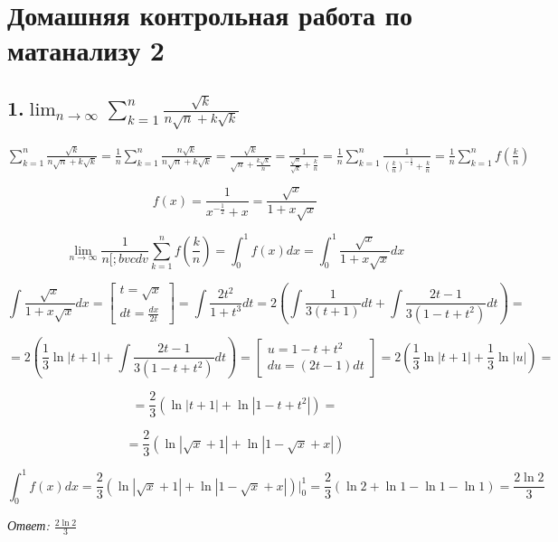 \documentclass[a4paper]{article}
\author{Васильев Павел}
\begin{document}
\section*{Домашняя контрольная работа по матанализу 2}

\subsection*{1.$\displaystyle \lim_{n \rightarrow \infty} \sum_{k=1}^n \frac{\sqrt{k}}{n \sqrt{n} + k \sqrt{k}}$}

$\displaystyle \sum_{k=1}^n \frac{\sqrt{k}}{n \sqrt{n} + k \sqrt{k}} = \frac{1}{n} \sum_{k=1}^n \frac{n \sqrt{k}}{n \sqrt{n} + k \sqrt{k}} = \frac{\sqrt{k}}{\sqrt{n} + \frac{k \sqrt{k}}{n}} = \frac{1}{\frac{\sqrt{n}}{\sqrt{k}} + \frac{k}{n}} = \frac{1}{n} \sum_{k=1}^n \frac{1}{ \left( \frac{k}{n} \right)^{-\frac{1}{2}} + \frac{k}{n}} = \frac{1}{n} \sum_{k=1}^n f \left( \frac{k}{n} \right)$

\[ \displaystyle f(x) = \frac{1}{x^{-\frac{1}{2}} + x} = \frac{ \sqrt{x} }{1 + x \sqrt{x}}
\]

\[
\displaystyle \lim_{n \rightarrow \infty} \frac{1}{n[;bvcdv} \sum_{k=1}^n f \left(\frac{k}{n} \right) = \int_0^1 f(x) dx = \int_0^1 \frac{ \sqrt{x} }{1 + x \sqrt{x}} dx
\]

\[
\int \frac{ \sqrt{x} }{1 + x \sqrt{x}} dx = \begin{bmatrix}
t = \sqrt{x} \\
 dt = \frac{dx}{2t}
\end{bmatrix}
= \int \frac{2t^2}{1+t^3} dt = 2 \left( \int \frac{1}{3(t+1)} dt + \int \frac{2t-1}{3(1-t+t^2)} dt \right) =
\]

\[
= 2 \left( \frac{1}{3} \ln |t+1| +\int \frac{2t-1}{3(1-t+t^2)} dt \right) = \begin{bmatrix}
u = 1-t+t^2 \\ du = (2t-1)dt
\end{bmatrix} = 2 \left( \frac{1}{3} \ln |t+1| + \frac{1}{3} \ln|u| \right) =
\]

\[
= \frac{2}{3} \left(\ln |t+1| + \ln|1-t+t^2| \right) = 
\]

\[
= \frac{2}{3} \left( \ln |\sqrt{x}+1| + \ln|1-\sqrt{x}+x| \right)
\]

\[
\int_0^1 f(x)dx = \frac{2}{3} \left( \ln |\sqrt{x}+1| + \ln|1-\sqrt{x}+x| \right) \bigg|_0^1 = \frac{2}{3} \left( \ln 2 + \ln 1 - \ln 1 - \ln 1 \right) = \frac{2 \ln 2}{3}
\]

\textit{Ответ: $\frac{2 \ln 2}{3}$}
\end{document}
